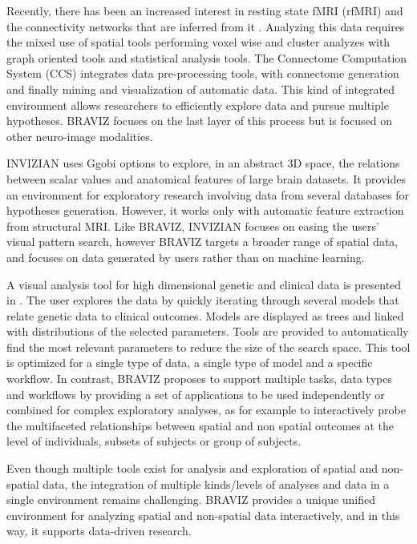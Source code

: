 \documentclass{frontiersHLTH}
\begin{document}
Recently, there has been an increased interest in resting state fMRI (rfMRI) and the connectivity networks that are inferred from it \cite{rubinov_complex_2010,biswal_toward_2010}. Analyzing this data requires the mixed use of spatial tools performing voxel wise and cluster analyzes with graph oriented tools and statistical analysis tools. The Connectome Computation System (CCS) \cite{xu_connectome_2015} integrates data pre-processing tools, with connectome generation and finally mining and visualization of automatic data. This kind of integrated environment allows researchers to efficiently explore data and pursue multiple hypotheses. BRAVIZ focuses on the last layer of this process but is focused on other neuro-image modalities. 

INVIZIAN \cite{bowman_query-based_2011, bowman_feature-similarity_2012, bowman_visual_2012} uses Ggobi options to explore, in an abstract 3D space, the relations between scalar values and anatomical features of large brain datasets. It provides an environment for exploratory research involving data from several databases for hypotheses generation. However, it works only with automatic feature extraction from structural MRI. Like BRAVIZ, INVIZIAN focuses on easing the users' visual pattern search, however BRAVIZ targets a broader range of spatial data, and focuses on data generated by users rather than on machine learning. 


A visual analysis tool for high dimensional genetic and clinical data is presented in \cite{hinterberg_peax:_2014}. The user explores the data by quickly iterating through several models that relate genetic data to clinical outcomes. Models are displayed as trees and linked with distributions of the selected parameters. Tools are provided to automatically find the most relevant parameters to reduce the size of the search space. This tool is optimized for a single type of data, a single type of model and a specific workflow. In contrast, BRAVIZ proposes to support multiple tasks, data types and workflows by providing a set of  applications to be used independently or combined for complex exploratory analyses, as for example to interactively probe the multifaceted relationships between spatial and non spatial outcomes at the level of individuals, subsets of subjects or group of subjects.
	
Even though multiple tools  exist for analysis and exploration of spatial and non-spatial data, the integration of multiple kinds/levels of analyses and data in a single environment remains challenging. BRAVIZ provides a unique unified environment for analyzing spatial and non-spatial data interactively, and in this way, it supports data-driven research.
\end{document}

